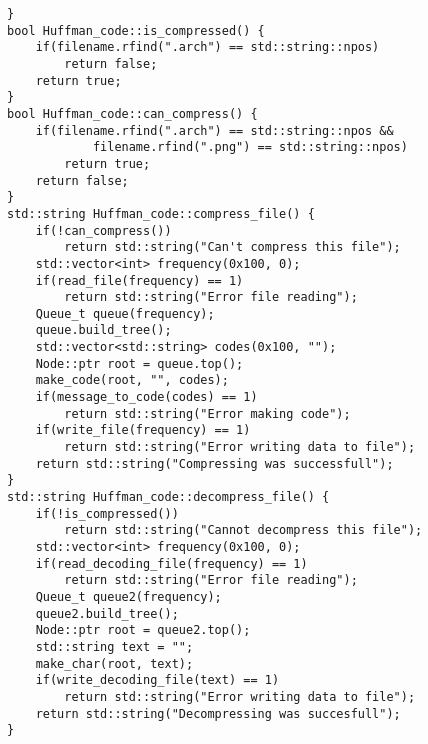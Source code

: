 \begin{verbatim}
}
bool Huffman_code::is_compressed() {
    if(filename.rfind(".arch") == std::string::npos)
        return false;
    return true;
}
bool Huffman_code::can_compress() {
    if(filename.rfind(".arch") == std::string::npos && 
            filename.rfind(".png") == std::string::npos)
        return true;
    return false;
}
std::string Huffman_code::compress_file() {
    if(!can_compress())
        return std::string("Can't compress this file");
    std::vector<int> frequency(0x100, 0);
    if(read_file(frequency) == 1)
        return std::string("Error file reading");
    Queue_t queue(frequency);
    queue.build_tree();
    std::vector<std::string> codes(0x100, "");
    Node::ptr root = queue.top();
    make_code(root, "", codes);
    if(message_to_code(codes) == 1)
        return std::string("Error making code");
    if(write_file(frequency) == 1)
        return std::string("Error writing data to file");
    return std::string("Compressing was successfull");
}
std::string Huffman_code::decompress_file() {
    if(!is_compressed())
        return std::string("Cannot decompress this file");
    std::vector<int> frequency(0x100, 0);
    if(read_decoding_file(frequency) == 1)
        return std::string("Error file reading");
    Queue_t queue2(frequency);
    queue2.build_tree();
    Node::ptr root = queue2.top();
    std::string text = "";
    make_char(root, text);
    if(write_decoding_file(text) == 1)
        return std::string("Error writing data to file");
    return std::string("Decompressing was succesfull");
}
\end{verbatim}
